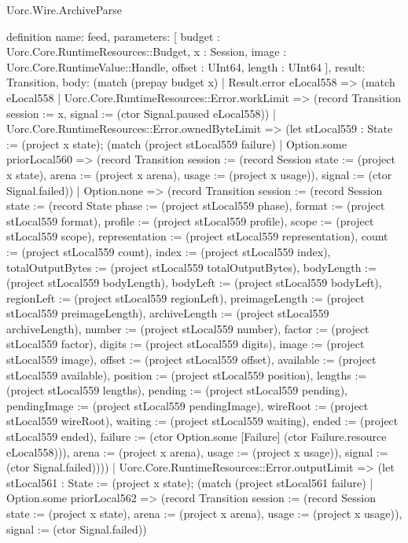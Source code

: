 \begin{lexlean}{Uorc.Wire.ArchiveParse}
\begin{semanticmodule}
definition{
  name: feed,
  parameters: [
    budget : Uorc.Core.RuntimeResources::Budget,
    x : Session,
    image : Uorc.Core.RuntimeValue::Handle,
    offset : UInt64,
    length : UInt64
  ],
  result: Transition,
  body: (match (prepay budget x)
    | Result.error eLocal558 => (match eLocal558
      | Uorc.Core.RuntimeResources::Error.workLimit => (record Transition {session := x, signal := (ctor Signal.paused eLocal558)})
      | Uorc.Core.RuntimeResources::Error.ownedByteLimit => (let stLocal559 : State := (project x state); (match (project stLocal559 failure)
        | Option.some priorLocal560 => (record Transition {session := (record Session {state := (project x state), arena := (project x arena), usage := (project x usage)}), signal := (ctor Signal.failed)})
        | Option.none => (record Transition {session := (record Session {state := (record State {phase := (project stLocal559 phase), format := (project stLocal559 format), profile := (project stLocal559 profile), scope := (project stLocal559 scope), representation := (project stLocal559 representation), count := (project stLocal559 count), index := (project stLocal559 index), totalOutputBytes := (project stLocal559 totalOutputBytes), bodyLength := (project stLocal559 bodyLength), bodyLeft := (project stLocal559 bodyLeft), regionLeft := (project stLocal559 regionLeft), preimageLength := (project stLocal559 preimageLength), archiveLength := (project stLocal559 archiveLength), number := (project stLocal559 number), factor := (project stLocal559 factor), digits := (project stLocal559 digits), image := (project stLocal559 image), offset := (project stLocal559 offset), available := (project stLocal559 available), position := (project stLocal559 position), lengths := (project stLocal559 lengths), pending := (project stLocal559 pending), pendingImage := (project stLocal559 pendingImage), wireRoot := (project stLocal559 wireRoot), waiting := (project stLocal559 waiting), ended := (project stLocal559 ended), failure := (ctor Option.some [Failure] (ctor Failure.resource eLocal558))}), arena := (project x arena), usage := (project x usage)}), signal := (ctor Signal.failed)})))
      | Uorc.Core.RuntimeResources::Error.outputLimit => (let stLocal561 : State := (project x state); (match (project stLocal561 failure)
        | Option.some priorLocal562 => (record Transition {session := (record Session {state := (project x state), arena := (project x arena), usage := (project x usage)}), signal := (ctor Signal.failed)})
}
\end{semanticmodule}
\end{lexlean}

